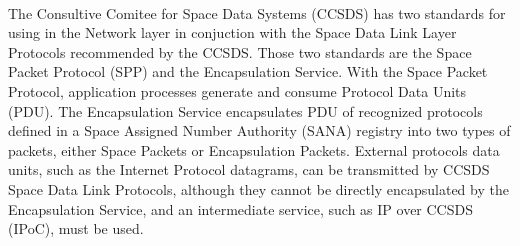 \documentclass[12pt,a4paper]{report}
\begin{document}
\paragraph{}The Consultive Comitee for Space Data Systems (CCSDS)\cite{CCSDSOverview} has two standards for using in the Network layer in conjuction with the Space Data Link Layer Protocols recommended by the CCSDS. Those two standards are the Space Packet Protocol (SPP)\cite{SPP} and the Encapsulation Service\cite{ES}. With the Space Packet Protocol, application processes generate and consume Protocol Data Units (PDU). The Encapsulation Service encapsulates PDU of recognized protocols defined in a Space Assigned Number Authority (SANA)\cite{SANA} registry into two types of packets, either Space Packets or Encapsulation Packets. External protocols data units, such as the Internet Protocol datagrams, can be transmitted by CCSDS Space Data Link Protocols, although they cannot be directly encapsulated by the Encapsulation Service, and an intermediate service, such as IP over CCSDS (IPoC)\cite{IPoC}, must be used.
\end{document}
